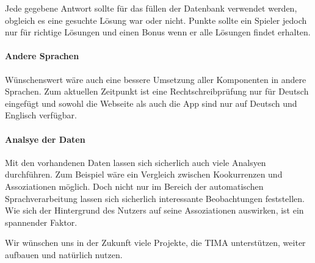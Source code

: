 Jede gegebene Antwort sollte für das füllen der Datenbank verwendet werden, obgleich
es eine gesuchte Lösung war oder nicht. Punkte sollte ein Spieler jedoch nur
für richtige Lösungen und einen Bonus wenn er alle Lösungen findet erhalten.

\paragraph{Andere Sprachen}
Wünschenswert wäre auch eine bessere Umsetzung aller Komponenten in andere Sprachen. Zum aktuellen Zeitpunkt ist eine Rechtschreibprüfung nur für Deutsch eingefügt und sowohl die Webseite als auch die App sind nur auf Deutsch und Englisch verfügbar.

\paragraph{Analsye der Daten}
Mit den vorhandenen Daten lassen sich sicherlich auch viele Analsyen durchführen. Zum Beispiel wäre ein Vergleich zwischen Kookurrenzen und Assoziationen möglich. Doch nicht nur im Bereich der automatischen Sprachverarbeitung lassen sich sicherlich interessante Beobachtungen feststellen. Wie sich der Hintergrund des Nutzers auf seine Assoziationen auswirken, ist ein spannender Faktor.
\newline

Wir wünschen uns in der Zukunft viele Projekte, die TIMA unterstützen, weiter aufbauen und natürlich nutzen.
